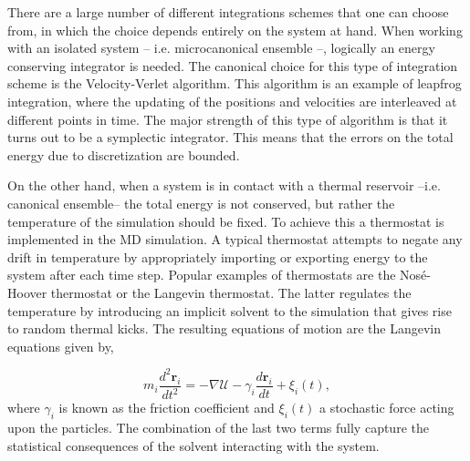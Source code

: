 There are a large number of different integrations schemes that one can choose
from, in which the choice depends entirely on the system at hand.
When working with an isolated system -- i.e. microcanonical ensemble --, logically an
energy conserving integrator is needed. The canonical
choice for this type of integration scheme is the Velocity-Verlet algorithm. This
algorithm is an example of leapfrog integration, where the updating of the positions
and velocities are interleaved at different points in time. The major strength of this
type of algorithm is that it turns out to be a symplectic integrator. This means that the
errors on the total energy due to discretization are bounded.

On the other hand, when a system is in contact with a thermal reservoir --i.e. canonical
ensemble-- the total energy is not conserved, but rather the temperature of the
simulation should be fixed. To achieve this a thermostat is implemented in the MD
simulation. A typical thermostat attempts to negate any drift in temperature by
appropriately importing or exporting energy to the system after each time step.
Popular examples of thermostats are the Nos\'e-Hoover thermostat or the Langevin
thermostat. The latter regulates the temperature by introducing an implicit solvent to
the simulation that gives rise to random thermal kicks. The resulting equations of motion
are the Langevin equations given by,

\begin{equation}
    m_i \frac{d^2 \boldsymbol{r}_i}{dt^2} = - \nabla \mathcal{U} - \gamma_i \frac{d
    \boldsymbol{r}_i}{d t} +
    \xi_i(t),
\end{equation}
where $\gamma_i$ is known  as the friction coefficient and $\xi_i(t)$ a stochastic force
acting upon the particles. The combination of the last two terms fully capture the
statistical consequences of the solvent interacting with the system.

